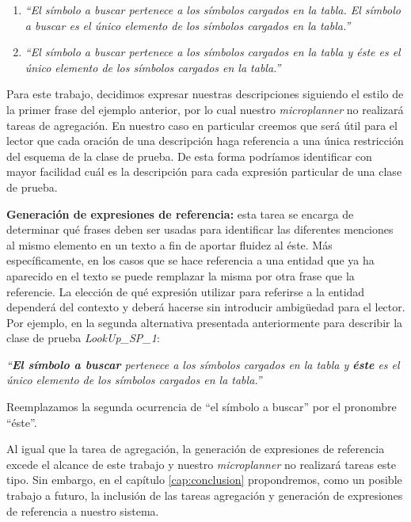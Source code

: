 \begin{center}
\begin{enumerate}
  \item \emph{``El símbolo a buscar pertenece a los símbolos cargados en la tabla. El símbolo a buscar es el único elemento de los símbolos cargados en la tabla.''} 
  \item \emph{``El símbolo a buscar pertenece a los símbolos cargados en la tabla y éste es el único elemento de los símbolos cargados en la tabla.''}
\end{enumerate}
\end{center}

\medskip
\noindent
Para este trabajo, decidimos expresar nuestras descripciones siguiendo el estilo de la primer frase del ejemplo anterior, por lo cual nuestro \textit{microplanner} no realizará tareas de agregación. En nuestro caso en particular creemos que será útil para el lector que cada oración de una descripción haga referencia a una única restricción del esquema de la clase de prueba. De esta forma podríamos identificar con mayor facilidad cuál es la descripción para cada expresión particular de una clase de prueba.


\medskip
\noindent
\textbf{Generación de expresiones de referencia:} esta tarea se encarga de determinar qué frases deben ser usadas para identificar las diferentes menciones al mismo elemento en un texto a fin de aportar fluidez al éste. Más específicamente, en los casos que se hace referencia a una entidad que ya ha aparecido en el texto se puede remplazar la misma por otra frase que la referencie. La elección de qué expresión utilizar para referirse a la entidad dependerá del contexto y deberá hacerse sin introducir ambigüedad para el lector. Por ejemplo, en la segunda alternativa presentada anteriormente para describir la clase de prueba \emph{LookUp\_SP\_1}:

\begin{center}
 \emph{``\textbf{El símbolo a buscar} pertenece a los símbolos cargados en la tabla y \textbf{éste} es el único elemento de los símbolos cargados en la tabla.''}
\end{center}

\noindent
Reemplazamos la segunda ocurrencia de ``el símbolo a buscar'' por el pronombre ``éste''.

\smallskip
Al igual que la tarea de agregación, la generación de expresiones de referencia excede el alcance de este trabajo y  nuestro \textit{microplanner} no realizará tareas este tipo. Sin embargo, en el capítulo \ref{cap:conclusion} propondremos, como un posible trabajo a futuro, la inclusión de las tareas agregación y generación de expresiones de referencia a nuestro sistema. 

